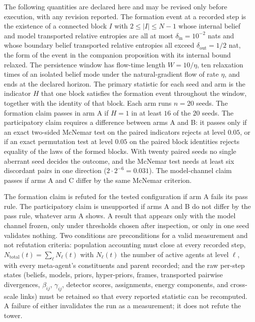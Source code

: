 \documentclass[11pt]{article}
\begin{document}
The following quantities are declared here and may be revised only before execution, with any revision reported. The formation event at a recorded step is the existence of a connected block $I$ with $2 \le |I| \le N-1$ whose internal belief and model transported relative entropies are all at most $\delta_{\mathrm{in}} = 10^{-2}$ nats and whose boundary belief transported relative entropies all exceed $\delta_{\mathrm{out}} = 1/2$ nat, the form of the event in the companion proposition with its internal bound relaxed. The persistence window has flow-time length $W = 10/\eta$, ten relaxation times of an isolated belief mode under the natural-gradient flow of rate $\eta$, and ends at the declared horizon. The primary statistic for each seed and arm is the indicator $H$ that one block satisfies the formation event throughout the window, together with the identity of that block. Each arm runs $n = 20$ seeds. The formation claim passes in arm A if $H = 1$ in at least $16$ of the $20$ seeds. The participatory claim requires a difference between arms A and B: it passes only if an exact two-sided McNemar test on the paired indicators rejects at level $0.05$, or if an exact permutation test at level $0.05$ on the paired block identities rejects equality of the laws of the formed blocks. With twenty paired seeds no single aberrant seed decides the outcome, and the McNemar test needs at least six discordant pairs in one direction ($2 \cdot 2^{-6} = 0.031$). The model-channel claim passes if arms A and C differ by the same McNemar criterion.

The formation claim is refuted for the tested configuration if arm A fails its pass rule. The participatory claim is unsupported if arms A and B do not differ by the pass rule, whatever arm A shows. A result that appears only with the model channel frozen, only under thresholds chosen after inspection, or only in one seed validates nothing. Two conditions are preconditions for a valid measurement and not refutation criteria: population accounting must close at every recorded step, $N_{\mathrm{total}}(t) = \sum_\ell N_\ell(t)$ with $N_\ell(t)$ the number of active agents at level $\ell$, with every meta-agent's constituents and parent recorded; and the raw per-step states (beliefs, models, priors, hyper-priors, frames, transported pairwise divergences, $\beta_{ij}$, $\gamma_{ij}$, detector scores, assignments, energy components, and cross-scale links) must be retained so that every reported statistic can be recomputed. A failure of either invalidates the run as a measurement; it does not refute the tower.
\end{document}

